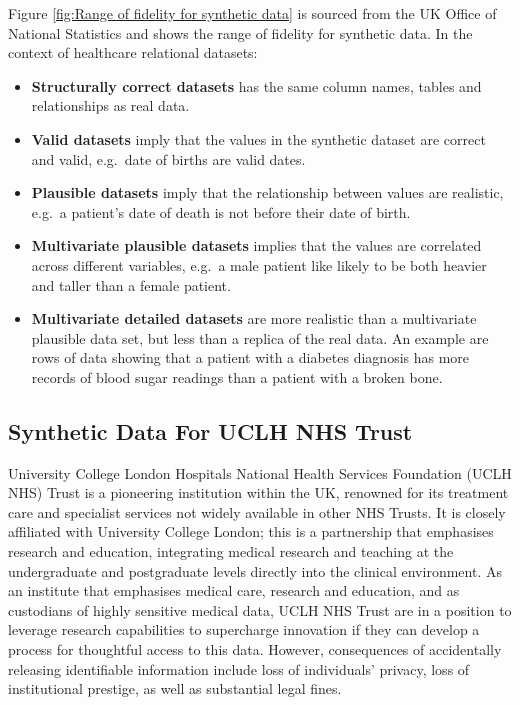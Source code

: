 \documentclass[11pt]{article}
\begin{document}
Figure \ref{fig:Range of fidelity for synthetic data} is sourced from the UK Office of National Statistics and shows the range of fidelity for synthetic data\cite{ONS2021}. In the context of healthcare relational datasets: 

\begin{itemize}
    \item \textbf{Structurally correct datasets} has the same column names, tables and relationships as real data. 
    \item \textbf{Valid datasets} imply that the values in the synthetic dataset are correct and valid, e.g.\ date of births are valid dates. 
    \item \textbf{Plausible datasets} imply that the relationship between values are realistic, e.g.\ a patient's date of death is not before their date of birth.
    \item \textbf{Multivariate plausible datasets} implies that the values are correlated across different variables, e.g.\ a male patient like likely to be both heavier and taller than a female patient. 
    \item \textbf{Multivariate detailed datasets} are more realistic than a multivariate plausible data set, but less than a replica of the real data. An example are rows of data showing that a patient with a diabetes diagnosis has more records of blood sugar readings than a patient with a broken bone.
\end{itemize}

\subsection{Synthetic Data For UCLH NHS Trust}

University College London Hospitals National Health Services Foundation (UCLH NHS) Trust  is a pioneering institution within the UK, renowned for its treatment care and specialist services not widely available in other NHS Trusts. It is closely affiliated with University College London; this is a partnership that emphasises research and education, integrating medical research and teaching at the undergraduate and postgraduate levels directly into the clinical environment. 
As an institute that emphasises medical care, research and education, and as custodians of highly sensitive medical data, UCLH NHS Trust are in a position to leverage research capabilities to supercharge innovation if they can develop a process for thoughtful access to this data. 
However, consequences of accidentally releasing identifiable information include loss of individuals' privacy, loss of institutional prestige, as well as substantial legal fines.
\end{document}
